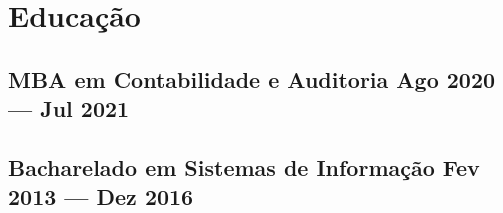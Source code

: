 \section{Educação}

\subsection{MBA em Contabilidade e Auditoria \hfill Ago 2020 --- Jul 2021}

\vspace{1.2em}

\subsection{Bacharelado em Sistemas de Informação \hfill Fev 2013 --- Dez 2016}

